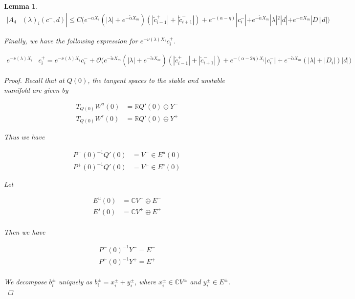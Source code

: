 \documentclass[12pt]{article}
\def\R{{\mathbb R}}
\def\C{{\mathbb C}}
\newtheorem{lemma}{Lemma}
\begin{document}
\begin{lemma}
\begin{align}
|A_4&(\lambda)_i(c^-, d)|
\leq C \Big( 
e^{-\alpha X_i} (|\lambda| + e^{-\tilde{\alpha}X_m})(|\tilde{c}_{i-1}^+| + |\tilde{c}_{i+1}^-|) + e^{-(\alpha - \eta) } |c_i^-| + e^{-\tilde{\alpha} X_m} |\lambda|^2|d| + e^{-\alpha X_m}|D||d| \Big)
\end{align}

Finally, we have the following expression for $e^{-\nu(\lambda)X_i} c_i^+$.

\begin{align}\label{tildecminus}
e^{-\nu(\lambda)X_i} &c_i^+ = e^{-\nu(\lambda)X_i} c_i^- 
+ \mathcal{O}\Big( e^{-\tilde{\alpha}X_m} (|\lambda| + e^{-\tilde{\alpha}X_m})( |\tilde{c}_{i-1}^+| + |\tilde{c}_{i+1}^-|) 
+ e^{-(\alpha - 2 \eta)X_i}|c_i^-| +  e^{-\tilde{\alpha}X_m}(|\lambda| + |D_i|)|d| \Big)
\end{align}

\begin{proof}

Recall that at $Q(0)$, the tangent spaces to the stable and unstable manifold are given by

\begin{align*}
T_{Q(0)} W^u(0) &= \R Q'(0) \oplus Y^- \\
T_{Q(0)} W^s(0) &= \R Q'(0) \oplus Y^+
\end{align*}

Thus we have

\begin{align*}
P^-(0)^{-1} Q'(0) &= V^- \in E^u(0) \\
P^+(0)^{-1} Q'(0) &= V^+ \in E^s(0)
\end{align*}

Let

\begin{align*}
E^u(0) &= \C V^- \oplus E^- \\
E^s(0) &= \C V^+ \oplus E^+ \\
\end{align*}

Then we have

\begin{align*}
P^-(0)^{-1} Y^- = E^- \\
P^+(0)^{-1} Y^+ = E^+ \\
\end{align*}

We decompose $b_i^\pm$ uniquely as $b_i^\pm = x_i^\pm + y_i^\pm$, where $x_i^\pm \in \C V^\pm$ and $y_i^\pm \in E^\pm$.\\


\end{proof}
\end{lemma}
\end{document}
